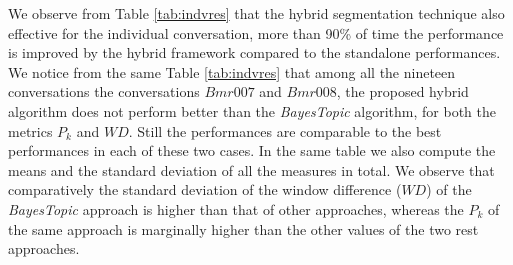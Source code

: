 \documentclass{article}
\begin{document}
We observe from Table \ref{tab:indvres} that the hybrid segmentation technique also effective for the individual conversation, more than 90\% of time the performance is improved by the hybrid framework compared to the standalone performances. We notice from the same Table \ref{tab:indvres} that among all the nineteen conversations the conversations $Bmr007$ and $Bmr008$, the proposed hybrid algorithm does not perform better than the \emph{BayesTopic} algorithm, for both the metrics $P_k$ and $WD$. Still the performances are comparable to the best performances in each of these two cases. %
In the same table we also compute the means and the standard deviation of all the measures in total. We observe that comparatively the standard deviation of the window difference ($WD$) of the \emph{BayesTopic} approach is higher than that of other approaches, whereas the $P_k$ of the same approach is marginally higher than the other values of the two rest approaches.
\end{document}
